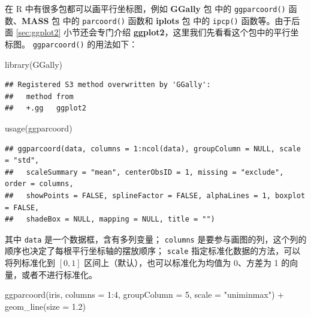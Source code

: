\documentclass[
  b5paper,
  UTF8,twoside]{book}
\newenvironment{Shaded}{\begin{snugshade}}{\end{snugshade}}
\newcommand{\AttributeTok}[1]{\textcolor[rgb]{0.77,0.63,0.00}{#1}}
\newcommand{\DecValTok}[1]{\textcolor[rgb]{0.00,0.00,0.81}{#1}}
\newcommand{\FloatTok}[1]{\textcolor[rgb]{0.00,0.00,0.81}{#1}}
\newcommand{\FunctionTok}[1]{\textcolor[rgb]{0.00,0.00,0.00}{#1}}
\newcommand{\NormalTok}[1]{#1}
\newcommand{\SpecialCharTok}[1]{\textcolor[rgb]{0.00,0.00,0.00}{#1}}
\newcommand{\StringTok}[1]{\textcolor[rgb]{0.31,0.60,0.02}{#1}}
\begin{document}
在 R 中有很多包都可以画平行坐标图，例如 \textbf{GGally} 包 \citep{GGally} 中的 \texttt{ggparcoord()} 函数、\textbf{MASS} 包 \citep{Venables02} 中的 \texttt{parcoord()} 函数和 \textbf{iplots} 包 \citep{iplots} 中的 \texttt{ipcp()} 函数等。由于后面 \ref{sec:ggplot2} 小节还会专门介绍 \textbf{ggplot2}，这里我们先看看这个包中的平行坐标图。 \texttt{ggparcoord()} 的用法如下：

\begin{Shaded}
\begin{Highlighting}[]
\FunctionTok{library}\NormalTok{(GGally)}
\end{Highlighting}
\end{Shaded}

\begin{verbatim}
## Registered S3 method overwritten by 'GGally':
##   method from   
##   +.gg   ggplot2
\end{verbatim}

\begin{Shaded}
\begin{Highlighting}[]
\FunctionTok{usage}\NormalTok{(ggparcoord)}
\end{Highlighting}
\end{Shaded}

\begin{verbatim}
## ggparcoord(data, columns = 1:ncol(data), groupColumn = NULL, scale = "std",
##   scaleSummary = "mean", centerObsID = 1, missing = "exclude", order = columns,
##   showPoints = FALSE, splineFactor = FALSE, alphaLines = 1, boxplot = FALSE,
##   shadeBox = NULL, mapping = NULL, title = "")
\end{verbatim}

其中 \texttt{data} 是一个数据框，含有多列变量； \texttt{columns} 是要参与画图的列，这个列的顺序也决定了每根平行坐标轴的摆放顺序； \texttt{scale} 指定标准化数据的方法，可以将列标准化到 \([0, 1]\) 区间上（默认），也可以标准化为均值为 0、方差为 1 的向量，或者不进行标准化。





\begin{Shaded}
\begin{Highlighting}[]
\FunctionTok{ggparcoord}\NormalTok{(iris, }\AttributeTok{columns =} \DecValTok{1}\SpecialCharTok{:}\DecValTok{4}\NormalTok{, }\AttributeTok{groupColumn =} \DecValTok{5}\NormalTok{, }\AttributeTok{scale =} \StringTok{"uniminmax"}\NormalTok{) }\SpecialCharTok{+} 
  \FunctionTok{geom\_line}\NormalTok{(}\AttributeTok{size =} \FloatTok{1.2}\NormalTok{)}
\end{Highlighting}
\end{Shaded}
\end{document}
